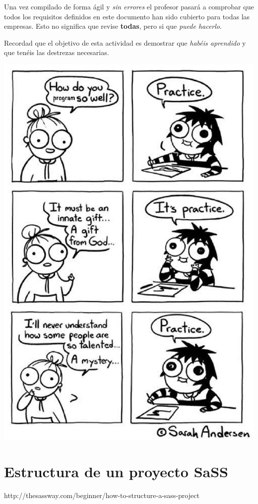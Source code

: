 \documentclass[a4paper,10pt]{article}
\begin{document}
Una vez compilado de forma ágil y \textit{sin errores} el profesor pasará a comprobar que todos los requisitos definidos en este documento han sido cubierto para todas las empresas. Esto no significa que revise \textbf{todas}, pero si que \textit{puede hacerlo}.

Recordad que el objetivo de esta actividad es demostrar que \textit{habéis aprendido} y que tenéis las destrezas necesarias.

\includegraphics{imgs/practice.eps}


\section{Estructura de un proyecto SaSS}

http://thesassway.com/beginner/how-to-structure-a-sass-project
\end{document}
